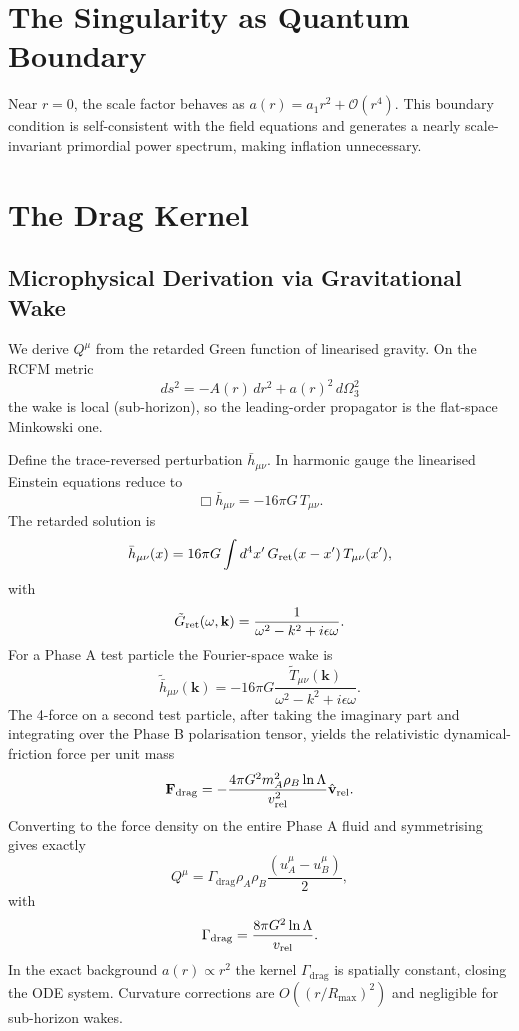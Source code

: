 \documentclass[10pt,twocolumn]{article}
\theoremstyle{definition}
\newcommand{\rhoA}{\rho_{A}}
\newcommand{\rhoB}{\rho_{B}}
\newcommand{\Gammadrag}{\Gamma_{\mathrm{drag}}}
\newcommand{\dOmega}{d\Omega_{3}^{2}}
\begin{document}
\section{The Singularity as Quantum Boundary}
\label{sec:singularity}

Near \( r=0 \), the scale factor behaves as \( a(r) = a_{1} r^{2} + \mathcal{O}(r^{4}) \).  
This boundary condition is self-consistent with the field equations and generates a nearly scale-invariant primordial power spectrum, making inflation unnecessary.



\section{The Drag Kernel}
\label{sec:drag}

\subsection{Microphysical Derivation via Gravitational Wake}

We derive \(Q^\mu\) from the retarded Green function of linearised gravity. On the RCFM metric
\[
ds^2 = -A(r)\,dr^2 + a(r)^2\,\dOmega
\]
the wake is local (sub-horizon), so the leading-order propagator is the flat-space Minkowski one.

Define the trace-reversed perturbation \(\bar{h}_{\mu\nu}\). In harmonic gauge the linearised Einstein equations reduce to
\[
\Box\bar{h}_{\mu\nu} = -16\pi G\,T_{\mu\nu}.
\]
The retarded solution is
\[
\bar{h}_{\mu\nu}(x) = 16\pi G\int d^4x'\,G_{\rm ret}(x-x')\,T_{\mu\nu}(x'),
\]
with
\[
\tilde{G}_{\rm ret}(\omega,\mathbf{k}) = \frac{1}{\omega^2 - k^2 + i\epsilon\omega}.
\]
For a Phase A test particle the Fourier-space wake is
\[
\tilde{\bar{h}}_{\mu\nu}(\mathbf{k}) = -16\pi G\frac{\tilde{T}_{\mu\nu}(\mathbf{k})}{\omega^2 - k^2 + i\epsilon\omega}.
\]
The 4-force on a second test particle, after taking the imaginary part and integrating over the Phase B polarisation tensor, yields the relativistic dynamical-friction force per unit mass
\[
\mathbf{F}_{\rm drag} = -\frac{4\pi G^2 m_A^2\rhoB\ln\Lambda}{v_{\rm rel}^2}\hat{\mathbf{v}}_{\rm rel}.
\]
Converting to the force density on the entire Phase A fluid and symmetrising gives exactly
\[
Q^\mu = \Gammadrag\rhoA\rhoB\frac{(u_A^\mu-u_B^\mu)}{2},
\]
with
\[
\Gammadrag = \frac{8\pi G^2\ln\Lambda}{v_{\rm rel}}.
\]
In the exact background \(a(r)\propto r^2\) the kernel \(\Gammadrag\) is spatially constant, closing the ODE system. Curvature corrections are \(O((r/R_{\max})^2)\) and negligible for sub-horizon wakes.
\end{document}
